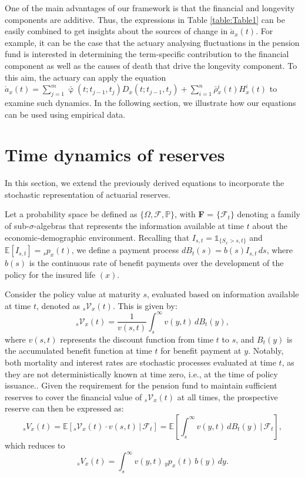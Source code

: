 \documentclass[12pt]{article}
\begin{document}
One of the main advantages of our framework is that the financial and longevity components are additive. Thus, the expressions in Table \ref{table:Table1} can be easily combined to get insights about the sources of change in $\acute{a}_x(t)$. For example, it can be the case that the actuary analysing fluctuations in the pension fund is interested in determining the term-specific contribution to the financial component as well as the causes of death that drive the longevity component. To this aim, the actuary can apply the equation $\acute{a}_x(t)=\sum_{j=1}^m\bar{\upvarphi}(t;t_{j-1},t_{j}){D}_x(t;t_{j-1},t_{j})+\sum_{i=1}^{n} \bar{\rho}{^i_x}(t){H}^{i}_x(t)$ to examine such dynamics. In the following section, we illustrate how our equations can be used using empirical data.



\FloatBarrier
\section{Time dynamics of reserves}\label{sec:Reserves}

In this section, we extend the previously derived equations to incorporate the stochastic representation of actuarial reserves.

Let a probability space be defined as $\{\Omega, \mathcal{F}, \mathbb{P}\}$, with \textbf{F} = $\{\mathcal{F}_t\}$ denoting a family of sub-$\sigma$-algebras that represents the information available at time $t$ about the economic-demographic environment. Recalling that $I_{s,t} = \mathds{1}_{\{S_x > s, t\}}$ and $\mathbb{E}[I_{s,t}] = {}_sp_x(t)$, we define a payment process $dB_t(s) = b(s) I_{s,t} \, ds$, where $b(s)$ is the continuous rate of benefit payments over the development of the policy for the insured life $(x)$.

Consider the policy value at maturity \( s \), evaluated based on information available at time \( t \), denoted as \({}_s\mathcal{V}_x(t)\). This is given by:
\[
{}_s\mathcal{V}_x(t) = \frac{1}{v(s, t)} \int_s^{\infty} v(y, t) \, dB_t(y),
\]
where \( v(s, t) \) represents the discount function from time \( t \) to \( s \), and \( B_t(y) \) is the accumulated benefit function at time \( t \) for benefit payment at \( y \). Notably, both mortality and interest rates are stochastic processes evaluated at time \( t \), as they are not deterministically known at time zero, i.e., at the time of policy issuance.. Given the requirement for the pension fund to maintain sufficient reserves to cover the financial value of \({}_s\mathcal{V}_x(t)\) at all times, the prospective reserve can then be expressed as:
\begin{equation}\label{eq:Reserve1}
	{}_sV_x(t) = \mathbb{E}[{}_s\mathcal{V}_x(t) \cdot v(s,t) \,|\, \mathcal{F}_t] = \mathbb{E} \left[ \int_s^\infty v(y,t) \, dB_t(y) \,|\, \mathcal{F}_t \right],
\end{equation}
which reduces to
\begin{equation}\label{eq:Reserve2}
	{}_sV_x(t) = \int_s^\infty v(y,t) \, {}_yp_x(t) \, b(y) \, dy.
\end{equation}
\end{document}
